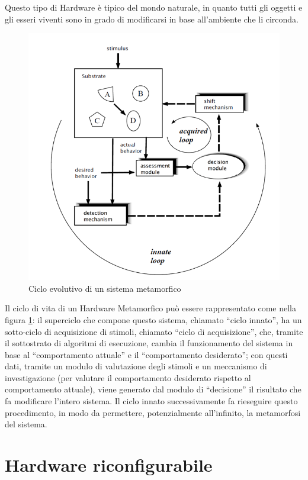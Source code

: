 \documentclass[a4paper,titlepage]{book}
\begin{document}
Questo tipo di Hardware è tipico del mondo naturale, in quanto tutti gli oggetti e gli esseri viventi sono in grado di modificarsi in base all'ambiente che li circonda.

\begin{figure}
\centering
\includegraphics[scale=0.6]{ciclo_evolutivo.png}
\caption{Ciclo evolutivo di un sistema metamorfico}\label{fig:1}
\end{figure}

Il ciclo di vita di un Hardware Metamorfico può essere rappresentato come nella figura \ref{fig:1}: il superciclo che compone questo sistema, chiamato ``ciclo innato'', ha un sotto-ciclo di acquisizione di stimoli, chiamato ``ciclo di acquisizione'', che, tramite il sottostrato di algoritmi di esecuzione, cambia il funzionamento del sistema in base al ``comportamento attuale'' e il ``comportamento desiderato''; con questi dati, tramite un modulo di valutazione degli stimoli e un meccanismo di investigazione (per valutare il comportamento desiderato rispetto al comportamento attuale), viene generato dal modulo di ``decisione'' il risultato che fa modificare l'intero sistema. Il ciclo innato successivamente fa rieseguire questo procedimento, in modo da permettere, potenzialmente all'infinito, la metamorfosi del sistema.

\section{Hardware riconfigurabile}
\end{document}
